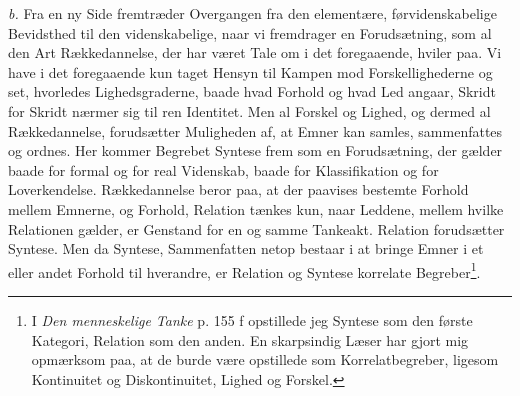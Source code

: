 \documentclass[12pt]{article}
\newcommand{\opage}[1]{\marginnote{\footnotesize\textit{[#1]}}}
\begin{document}
\textit{b.} Fra en ny Side fremtræder Overgangen fra den elementære,
førvidenskabelige Bevidsthed til den videnskabelige, naar vi fremdrager en
Forudsætning, som al den Art Rækkedannelse, der har været Tale om i det
foregaaende, hviler paa. Vi have i det foregaaende kun taget Hensyn til Kampen
mod Forskellighederne og set, hvorledes Lighedsgraderne, baade hvad Forhold og
hvad Led angaar, Skridt for Skridt nærmer sig til ren Identitet. Men al Forskel
og Lighed, og dermed al Rækkedannelse, forudsætter Muligheden af, at Emner kan
samles, sammenfattes og ordnes. Her kommer Begrebet Syntese frem som en
Forudsætning, der gælder baade for formal og for real Videnskab, baade for
Klassifikation og for Loverkendelse. Rækkedannelse beror paa, at der paavises
bestemte Forhold mellem Emnerne, og Forhold, Relation tænkes kun, naar Leddene,
mellem hvilke Relationen gælder, er Genstand for en og samme Tankeakt. Relation
forudsætter Syntese. Men da
\setcounter{footnote}{0}%
\opage{12}Syntese, Sammenfatten netop bestaar i at bringe Emner i et eller andet
Forhold til hverandre, er Relation og Syntese korrelate
Begreber\footnote{I \textit{Den menneskelige Tanke} p. 155 f opstillede jeg
Syntese som den første Kategori, Relation som den anden. En skarpsindig Læser
har gjort mig opmærksom paa, at de burde være opstillede som Korrelatbegreber,
ligesom Kontinuitet og Diskontinuitet, Lighed og Forskel.}.
\end{document}
